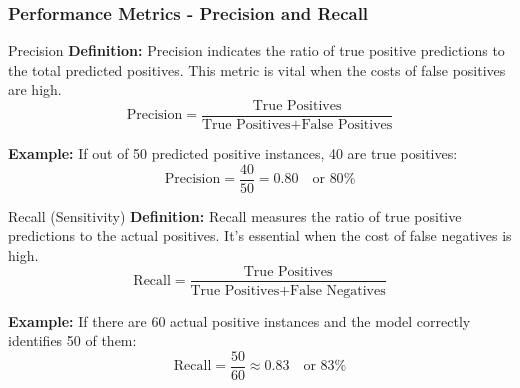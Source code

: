 \documentclass[aspectratio=169]{beamer}
\begin{document}
\begin{frame}[fragile]
    \frametitle{Performance Metrics - Precision and Recall}
    \begin{block}{Precision}
        \textbf{Definition:} Precision indicates the ratio of true positive predictions to the total predicted positives. This metric is vital when the costs of false positives are high.
        \begin{equation}
            \text{Precision} = \frac{\text{True Positives}}{\text{True Positives} + \text{False Positives}}
        \end{equation}

        \textbf{Example:} If out of 50 predicted positive instances, 40 are true positives:
        \begin{equation}
            \text{Precision} = \frac{40}{50} = 0.80 \quad \text{or } 80\%
        \end{equation}
    \end{block}

    \begin{block}{Recall (Sensitivity)}
        \textbf{Definition:} Recall measures the ratio of true positive predictions to the actual positives. It’s essential when the cost of false negatives is high.
        \begin{equation}
            \text{Recall} = \frac{\text{True Positives}}{\text{True Positives} + \text{False Negatives}}
        \end{equation}

        \textbf{Example:} If there are 60 actual positive instances and the model correctly identifies 50 of them:
        \begin{equation}
            \text{Recall} = \frac{50}{60} \approx 0.83 \quad \text{or } 83\%
        \end{equation}
    \end{block}
\end{frame}
\end{document}
